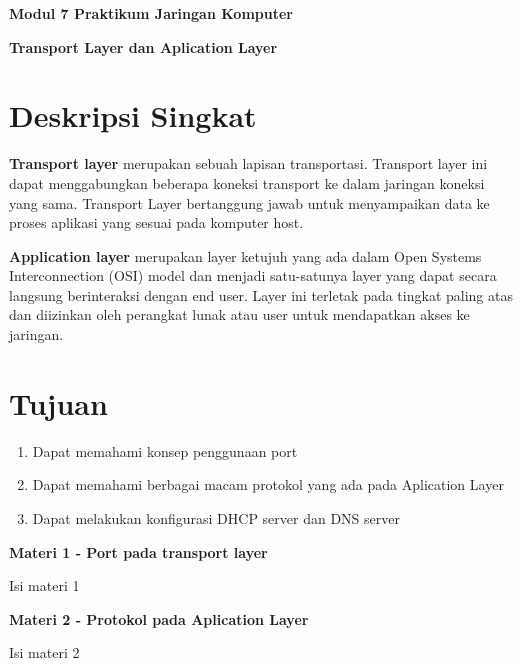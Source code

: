\documentclass{article}
\begin{document}
    \begin{center}
        \textbf{Modul 7 Praktikum Jaringan Komputer}

        \textbf{Transport Layer dan Aplication Layer}
    \end{center}

    \section*{Deskripsi Singkat}

    \begin{flushleft}
        \textbf{Transport layer} merupakan sebuah lapisan transportasi. 
        Transport layer ini dapat menggabungkan beberapa koneksi transport ke dalam jaringan koneksi yang sama. 
        Transport Layer bertanggung jawab untuk menyampaikan data ke proses aplikasi yang sesuai pada komputer host.
        \newline

        \textbf{Application layer} merupakan layer ketujuh yang ada dalam Open Systems Interconnection (OSI) model dan menjadi satu-satunya layer yang dapat secara langsung berinteraksi dengan end user. 
        Layer ini terletak pada tingkat paling atas dan diizinkan oleh perangkat lunak atau user untuk mendapatkan akses ke jaringan. 
    \end{flushleft}

    \section*{Tujuan}
    \begin{enumerate}
        \item Dapat memahami konsep penggunaan port
        \item Dapat memahami berbagai macam protokol yang ada pada Aplication Layer
        \item Dapat melakukan konfigurasi DHCP server dan DNS server
    \end{enumerate}

    \begin{flushleft}
        \textbf{Materi 1 - Port pada transport layer}
        \newline

        Isi materi 1
    \end{flushleft}

    \begin{flushleft}
        \textbf{Materi 2 - Protokol pada Aplication Layer}
        \newline

        Isi materi 2
    \end{flushleft}
\end{document}

